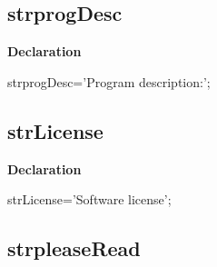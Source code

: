 \documentclass{report}
\newif\ifpdf
\begin{document}
\subsection*{strprogDesc}
\fi
\label{trstrings-strprogDesc}
\begin{list}{}{
\setlength{\itemindent}{0cm}
\setlength{\listparindent}{0cm}
\setlength{\leftmargin}{\evensidemargin}
\addtolength{\leftmargin}{\tmplength}
\settowidth{\labelsep}{X}
\addtolength{\leftmargin}{\labelsep}
\setlength{\labelwidth}{\tmplength}
}
\item[\textbf{Declaration}\hfill]
\ifpdf
\begin{flushleft}
\fi
\begin{ttfamily}
strprogDesc='Program description:';\end{ttfamily}

\ifpdf
\end{flushleft}
\fi

\end{list}
\ifpdf
\subsection*{\large{\textbf{strLicense}}\normalsize\hspace{1ex}\hrulefill}
\else
\subsection*{strLicense}
\fi
\label{trstrings-strLicense}
\begin{list}{}{
\setlength{\itemindent}{0cm}
\setlength{\listparindent}{0cm}
\setlength{\leftmargin}{\evensidemargin}
\addtolength{\leftmargin}{\tmplength}
\settowidth{\labelsep}{X}
\addtolength{\leftmargin}{\labelsep}
\setlength{\labelwidth}{\tmplength}
}
\item[\textbf{Declaration}\hfill]
\ifpdf
\begin{flushleft}
\fi
\begin{ttfamily}
strLicense='Software license';\end{ttfamily}

\ifpdf
\end{flushleft}
\fi

\end{list}
\ifpdf
\subsection*{\large{\textbf{strpleaseRead}}\normalsize\hspace{1ex}\hrulefill}
\else
\end{document}
